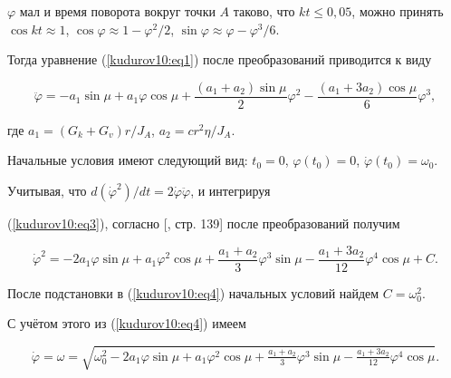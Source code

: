 $\varphi $ мал и время поворота вокруг точки $A$ таково, что $kt\le 0{,}05$, можно принять $\cos kt\approx 1$, $\cos \varphi

\approx 1-{\varphi^2}/{2}$, $\sin \varphi \approx \varphi -{\varphi^3}/{6}$. 

Тогда уравнение (\ref{kudurov10:eq1}) после преобразований приводится к виду

\begin{equation}

\label{kudurov10:eq3}

\ddot {\varphi }=-a_1 \sin \mu + a_1 \varphi \cos \mu 

+\frac{\left( a_1 +a_2 \right)\sin \mu }{2}\varphi

^2-\frac{\left( a_1 + 3a_2 \right)\cos \mu }{6}\varphi^3,

\end{equation}

где $a_1 ={\left( G_k +G_v \right)r}/{J_A}$, $a_2 ={cr^2\eta}/{J_A}$.



Начальные условия имеют следующий вид: $t_0=0$, $\varphi \left( t_0 \right)=0$, $\dot {\varphi }\left( t_0 \right)=\omega_0$.

Учитывая, что ${d( \dot {\varphi}^2 )}/{dt}=2 \dot {\varphi}\ddot{\varphi}$, и интегрируя

(\ref{kudurov10:eq3}), согласно [, стр. 139] после преобразований получим

\begin{equation}

\label{kudurov10:eq4}

\dot {\varphi}^2=-2a_1 \varphi \sin \mu + a_1 \varphi^2 \cos \mu +\frac{a_1 + a_2}{3} \varphi^3 \sin \mu

-\frac{a_1 +3a_2}{12}\varphi^4 \cos \mu + C.

\end{equation}

После подстановки в (\ref{kudurov10:eq4}) начальных условий найдем $C=\omega_0^2$. 

С учётом этого из (\ref{kudurov10:eq4}) имеем

\begin{equation}

\label{kudurov10:eq5}

\dot {\varphi}=\omega =\sqrt {\omega_0^2 - 2a_1 \varphi \sin \mu + a_1 \varphi^2 \cos \mu +\tfrac{a_1 + a_2

}{3}\varphi^3 \sin \mu - \tfrac{a_1 +3a_2}{12}\varphi^4 \cos \mu}.

\end{equation}



